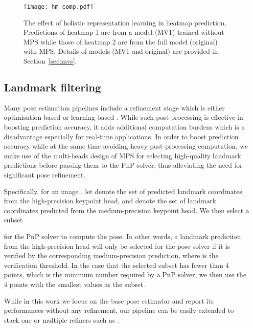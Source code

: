 \documentclass[10pt,twocolumn,letterpaper]{article}
\begin{document}
\begin{figure}[t]
    \centering
    \texttt{[image: hm\_comp.pdf]}
    \caption{The effect of holistic representation learning in heatmap prediction. Predictions of heatmap 1 are from a model (MV1) trained without MPS while those of heatmap 2 are from the full model (original) with MPS. Details of models (MV1 and original) are provided in Section~\ref{sec:mvs}. }
    \label{fig:hm_comp}
\end{figure}

\subsection{Landmark filtering}
Many pose estimation pipelines include a refinement stage which is either optimisation-based \cite{Kehl2017ssd, Chen2019satellite, song2020hybridpose} or learning-based \cite{rad2017bb8, li2020deepim, labbe2020cosypose, Zakharov2019dpod}. While such post-processing is effective in boosting prediction accuracy, it adds additional computation burdens which is a disadvantage especially for real-time applications. In order to boost prediction accuracy while at the same time avoiding heavy post-processing computation, we make use of the multi-heads design of MPS for selecting high-quality landmark predictions before passing them to the PnP solver, thus alleviating the need for significant pose refinement. 

Specifically, for an image , let  denote the set of predicted landmark coordinates from the high-precision keypoint head, and  denote the set of landmark coordinates predicted from the medium-precision keypoint head. We then select a subset

for the PnP solver to compute the pose. In other words, a landmark prediction from the high-precision head will only be selected for the pose solver if it is verified by the corresponding medium-precision prediction, where  is the verification threshold. In the case that the selected subset has fewer than 4 points, which is the minimum number required by a PnP solver, we then use the 4 points with the smallest  values as the subset. 

While in this work we focus on the base pose estimator and report its performances without any refinement, our pipeline can be easily extended to stack one or multiple refiners such as \cite{Manhardt2018deep, Li2018deepim, sundermeyer2020multi}.
\end{document}
